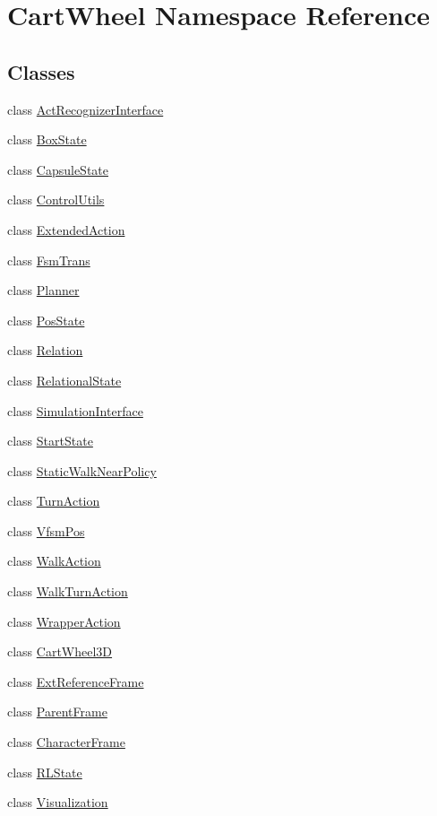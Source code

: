 \hypertarget{namespaceCartWheel}{
\section{CartWheel Namespace Reference}
\label{namespaceCartWheel}
}
\subsection*{Classes}
\begin{DoxyCompactItemize}
\item 
class \hyperlink{classCartWheel_1_1ActRecognizerInterface}{ActRecognizerInterface}
\item 
class \hyperlink{classCartWheel_1_1BoxState}{BoxState}
\item 
class \hyperlink{classCartWheel_1_1CapsuleState}{CapsuleState}
\item 
class \hyperlink{classCartWheel_1_1ControlUtils}{ControlUtils}
\item 
class \hyperlink{classCartWheel_1_1ExtendedAction}{ExtendedAction}
\item 
class \hyperlink{classCartWheel_1_1FsmTrans}{FsmTrans}
\item 
class \hyperlink{classCartWheel_1_1Planner}{Planner}
\item 
class \hyperlink{classCartWheel_1_1PosState}{PosState}
\item 
class \hyperlink{classCartWheel_1_1Relation}{Relation}
\item 
class \hyperlink{classCartWheel_1_1RelationalState}{RelationalState}
\item 
class \hyperlink{classCartWheel_1_1SimulationInterface}{SimulationInterface}
\item 
class \hyperlink{classCartWheel_1_1StartState}{StartState}
\item 
class \hyperlink{classCartWheel_1_1StaticWalkNearPolicy}{StaticWalkNearPolicy}
\item 
class \hyperlink{classCartWheel_1_1TurnAction}{TurnAction}
\item 
class \hyperlink{classCartWheel_1_1VfsmPos}{VfsmPos}
\item 
class \hyperlink{classCartWheel_1_1WalkAction}{WalkAction}
\item 
class \hyperlink{classCartWheel_1_1WalkTurnAction}{WalkTurnAction}
\item 
class \hyperlink{classCartWheel_1_1WrapperAction}{WrapperAction}
\item 
class \hyperlink{classCartWheel_1_1CartWheel3D}{CartWheel3D}
\item 
class \hyperlink{classCartWheel_1_1ExtReferenceFrame}{ExtReferenceFrame}
\item 
class \hyperlink{classCartWheel_1_1ParentFrame}{ParentFrame}
\item 
class \hyperlink{classCartWheel_1_1CharacterFrame}{CharacterFrame}
\item 
class \hyperlink{classCartWheel_1_1RLState}{RLState}
\item 
class \hyperlink{classCartWheel_1_1Visualization}{Visualization}
\end{DoxyCompactItemize}
